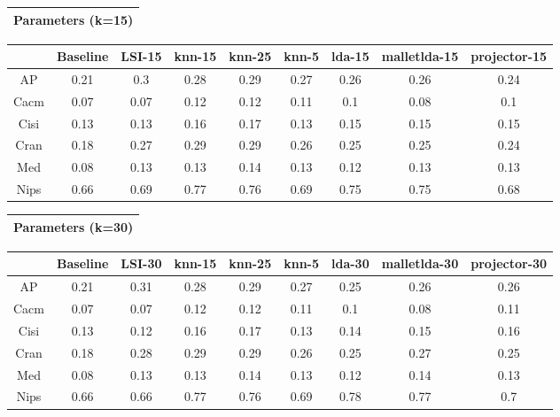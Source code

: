 \documentclass[10pt]{article}
\begin{document}
\begin{tabular}{|c|}
\hline 
Parameters (k=15) \\
 \hline 

\end{tabular}



\begin{tabular}{|c|c|c|c|c|c|c|c|c|}
\hline 
 &Baseline &LSI-15 &knn-15 &knn-25 &knn-5 &lda-15 &malletlda-15 &projector-15 \\
 \hline 
AP &0.21 &0.3 &0.28 &0.29 &0.27 &0.26 &0.26 &0.24 \\
 \hline 
Cacm &0.07 &0.07 &0.12 &0.12 &0.11 &0.1 &0.08 &0.1 \\
 \hline 
Cisi &0.13 &0.13 &0.16 &0.17 &0.13 &0.15 &0.15 &0.15 \\
 \hline 
Cran &0.18 &0.27 &0.29 &0.29 &0.26 &0.25 &0.25 &0.24 \\
 \hline 
Med &0.08 &0.13 &0.13 &0.14 &0.13 &0.12 &0.13 &0.13 \\
 \hline 
Nips &0.66 &0.69 &0.77 &0.76 &0.69 &0.75 &0.75 &0.68 \\
 \hline 

\end{tabular}



\begin{tabular}{|c|}
\hline 
Parameters (k=30) \\
 \hline 

\end{tabular}



\begin{tabular}{|c|c|c|c|c|c|c|c|c|}
\hline 
 &Baseline &LSI-30 &knn-15 &knn-25 &knn-5 &lda-30 &malletlda-30 &projector-30 \\
 \hline 
AP &0.21 &0.31 &0.28 &0.29 &0.27 &0.25 &0.26 &0.26 \\
 \hline 
Cacm &0.07 &0.07 &0.12 &0.12 &0.11 &0.1 &0.08 &0.11 \\
 \hline 
Cisi &0.13 &0.12 &0.16 &0.17 &0.13 &0.14 &0.15 &0.16 \\
 \hline 
Cran &0.18 &0.28 &0.29 &0.29 &0.26 &0.25 &0.27 &0.25 \\
 \hline 
Med &0.08 &0.13 &0.13 &0.14 &0.13 &0.12 &0.14 &0.13 \\
 \hline 
Nips &0.66 &0.66 &0.77 &0.76 &0.69 &0.78 &0.77 &0.7 \\
 \hline 

\end{tabular}
\end{document}

